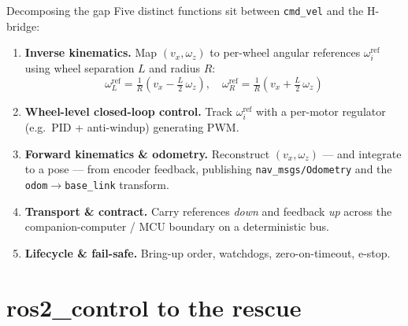 \begin{frame}{Decomposing the gap}
  Five distinct functions sit between \texttt{cmd\_vel} and the H-bridge:

  \vspace{0.4em}
  \begin{enumerate}\setlength\itemsep{3pt}
    \item \textbf{Inverse kinematics.}\;
          Map \((v_x,\omega_z)\) to per-wheel angular references
          \(\omega^{\text{ref}}_{i}\) using wheel separation \(L\) and
          radius \(R\):
          \[
            \omega^{\text{ref}}_{L} = \tfrac{1}{R}\!\left(v_x-\tfrac{L}{2}\,\omega_z\right),\quad
            \omega^{\text{ref}}_{R} = \tfrac{1}{R}\!\left(v_x+\tfrac{L}{2}\,\omega_z\right)
          \]
    \item \textbf{Wheel-level closed-loop control.}\;
          Track \(\omega^{\text{ref}}_{i}\) with a per-motor regulator
          (e.g.\ PID + anti-windup) generating PWM.
    \item \textbf{Forward kinematics \& odometry.}\;
          Reconstruct \((v_x,\omega_z)\) — and integrate to a pose — from
          encoder feedback, publishing \texttt{nav\_msgs/Odometry} and
          the \texttt{odom}\(\to\)\texttt{base\_link} transform.
    \item \textbf{Transport \& contract.}\;
          Carry references \emph{down} and feedback \emph{up} across the
          companion-computer / MCU boundary on a deterministic bus.
    \item \textbf{Lifecycle \& fail-safe.}\;
          Bring-up order, watchdogs, zero-on-timeout, e-stop.
  \end{enumerate}
\end{frame}

\section{ros2\_control to the rescue}

